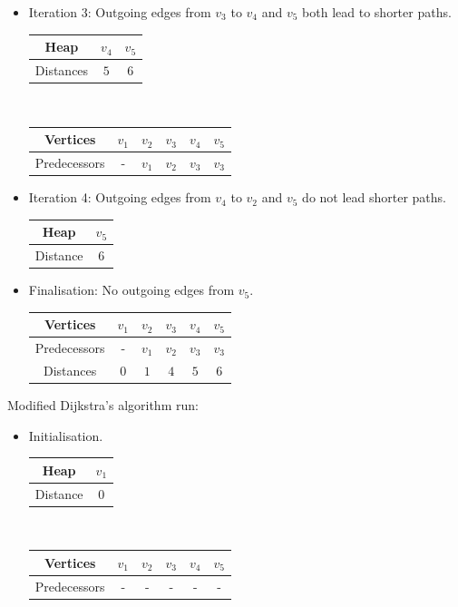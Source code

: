 \begin{table}[h]
\begin{minipage}[t]{0.45 \textwidth}
\begin{itemize}
	\item Iteration 3: Outgoing edges from $v_3$ to $v_4$ and $v_5$
		both lead to shorter paths.
	
	\begin{tabular}{|c|cc|}
			\hline
			     Heap & $v_4$ & $v_5$  \tabularnewline
			\hline
			Distances &  $5$  &  $6$   \tabularnewline
			\hline
	\end{tabular}\\
	\begin{tabular}{|c|ccccc|}
			\hline
			     Vertices & $v_1$ & $v_2$ & $v_3$ & $v_4$ & $v_5$ \tabularnewline
			\hline
			Predecessors &  -  &  $v_1$ &  $v_2$ &     $v_3$ &    $v_3$ \tabularnewline
			\hline
	\end{tabular}


	\item Iteration 4: Outgoing edges from $v_4$ to $v_2$ and $v_5$
		do not lead shorter paths.
	
	\begin{tabular}{|c|c|}
			\hline
			     Heap & $v_5$ \tabularnewline
			\hline
			Distance &  $6$   \tabularnewline
			\hline
	\end{tabular}


	\item Finalisation: No outgoing edges from $v_5$.
	
	\begin{tabular}{|c|ccccc|}
			\hline
			     Vertices & $v_1$ & $v_2$ & $v_3$ & $v_4$ & $v_5$ \tabularnewline
			\hline
			Predecessors &  -  &  $v_1$ &  $v_2$ &     $v_3$ &    $v_3$ \tabularnewline
			Distances &  $0$  &  $1$ &  $4$ &     $5$ &    $6$ \tabularnewline
			\hline
	\end{tabular}

	\end{itemize}
	\end{minipage}
	\begin{minipage}[t]{0.45 \textwidth}
	Modified Dijkstra's algorithm \cite[p. 285]{Erickson2019} run:
	\begin{itemize}
	\item Initialisation.
	
	\begin{tabular}{|c|c|}
			\hline
			     Heap & $v_1$ \tabularnewline
			\hline
			Distance &  $0$  \tabularnewline
			\hline
	\end{tabular}\\
	\begin{tabular}{|c|ccccc|}
			\hline
			     Vertices & $v_1$ & $v_2$ & $v_3$ & $v_4$ & $v_5$ \tabularnewline
			\hline
			Predecessors &  -  &  - &  - &     - &    - \tabularnewline
			\hline
	\end{tabular}
	


\end{itemize}
\end{minipage}
\end{table}
